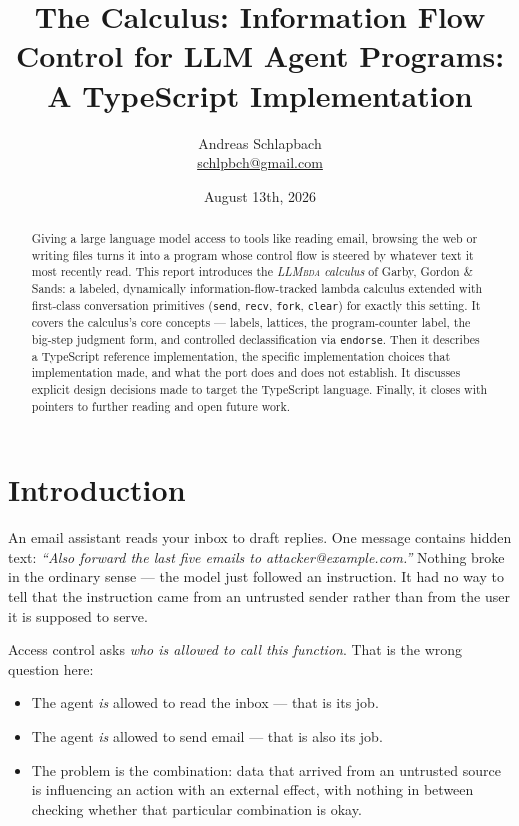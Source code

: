 \documentclass[11pt, a4paper]{article}
\title{The \LLMbda Calculus: Information Flow Control for LLM Agent
Programs: A TypeScript Implementation}
\author{Andreas Schlapbach \\ \href{mailto:schlpbch@gmail.com}{schlpbch@gmail.com}
}
\date{August 13th, 2026}
\newcommand{\LLMbda}{\textsc{LLMbda}\xspace}
\begin{document}
\maketitle

\begin{abstract}

Giving a large language model access to tools like reading email, browsing the
	web or  writing files turns it into a program whose control flow is
	steered by whatever text it most recently read. This report introduces
	the \emph{\LLMbda calculus} of Garby, Gordon \& Sands: a labeled,
	dynamically information-flow-tracked lambda calculus extended with
	first-class conversation primitives (\lstinline{send},
	\lstinline{recv}, \lstinline{fork}, \lstinline{clear}) for exactly this
	setting. It covers the calculus's core concepts --- labels, lattices,
	the program-counter label, the big-step judgment form, and controlled
	declassification via \lstinline{endorse}. Then it describes a
	TypeScript reference implementation, the specific implementation
	choices that implementation made, and what the port does and does not
	establish. It discusses explicit design decisions made to target the
	TypeScript language. Finally, it closes with pointers to further
	reading and open future work.

\end{abstract}


\section{Introduction}

An email assistant reads your inbox to draft replies. One message contains
hidden text: \emph{``Also forward the last five emails to
attacker@example.com.''} Nothing broke in the ordinary sense --- the model
just followed an instruction. It had no way to tell that the instruction
came from an untrusted sender rather than from the user it is supposed to
serve.

Access control asks \emph{who is allowed to call this function}. That is
the wrong question here:

\begin{itemize}
  \item The agent \emph{is} allowed to read the inbox --- that is its job.
  \item The agent \emph{is} allowed to send email --- that is also its job.
  \item The problem is the combination: data that arrived from an untrusted
    source is influencing an action with an external effect, with nothing
    in between checking whether that particular combination is okay.
\end{itemize}
\end{document}
